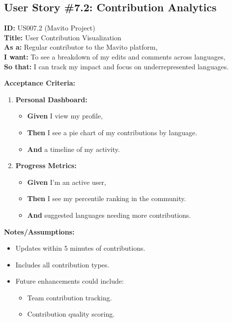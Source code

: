 \documentclass[12pt]{article}
\begin{document}
\subsection{User Story \#7.2: Contribution Analytics}

\textbf{ID:} US007.2 (Mavito Project) \\
\textbf{Title:} User Contribution Visualization \\
\textbf{As a:} Regular contributor to the Mavito platform, \\
\textbf{I want:} To see a breakdown of my edits and comments across languages, \\
\textbf{So that:} I can track my impact and focus on underrepresented languages.

\vspace{1em}
\textbf{Acceptance Criteria:}
\begin{enumerate}
    \item \textbf{Personal Dashboard:}
    \begin{itemize}
        \item \textbf{Given} I view my profile,
        \item \textbf{Then} I see a pie chart of my contributions by language.
        \item \textbf{And} a timeline of my activity.
    \end{itemize}

    \item \textbf{Progress Metrics:}
    \begin{itemize}
        \item \textbf{Given} I'm an active user,
        \item \textbf{Then} I see my percentile ranking in the community.
        \item \textbf{And} suggested languages needing more contributions.
    \end{itemize}
\end{enumerate}

\vspace{1em}
\textbf{Notes/Assumptions:}
\begin{itemize}
    \item Updates within 5 minutes of contributions.
    \item Includes all contribution types.
    \item Future enhancements could include:
    \begin{itemize}
        \item Team contribution tracking.
        \item Contribution quality scoring.
    \end{itemize}
\end{itemize}
\end{document}
